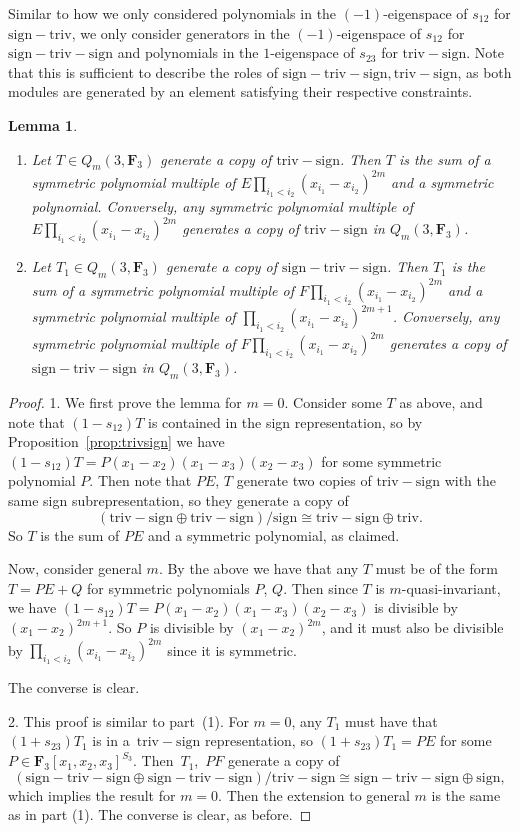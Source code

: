 \documentclass[pdftex]{sigma}
\newtheorem{Lemma}[Theorem]{Lemma}
\theoremstyle{definition}
\numberwithin{equation}{section}
\newcommand{\triv}{\mathrm{triv}}
\newcommand{\sign}{\mathrm{sign}}
\newcommand{\six}{\mathrm{sign-triv-sign}}
\newcommand{\siv}{\mathrm{sign-triv}}
\newcommand{\tign}{\mathrm{triv-sign}}
\begin{document}
 Similar to how we only considered polynomials in the $(-1)$-eigenspace of $s_{12}$ for $\siv$, we only consider generators in the $(-1)$-eigenspace of $s_{12}$ for $\six$ and polynomials in the $1$-eigenspace of $s_{23}$ for $\tign$. Note that this is sufficient to describe the roles of $\six,\tign$, as both modules are generated by an element satisfying their respective constraints.

 \begin{Lemma}\label{lem:sixgen}
 \quad
 \begin{enumerate}\itemsep=0pt
\item[$1.$] Let $T\in Q_m(3,\mathbf{F}_3)$ generate a copy of $\tign$. Then $T$ is the sum of a symmetric polynomial multiple of $E\prod_{i_1<i_2}(x_{i_1}-x_{i_2})^{2m}$ and a symmetric polynomial. Conversely, any symmetric polynomial multiple of $E\prod_{i_1<i_2}(x_{i_1}-x_{i_2})^{2m}$ generates a copy of $\tign$ in $Q_m(3,\mathbf{F}_3)$.
\item[$2.$] Let $T_1\in Q_m(3,\mathbf{F}_3)$ generate a copy of $\six$. Then $T_1$ is the sum of a symmetric polynomial multiple of $F\prod_{i_1<i_2}(x_{i_1}-x_{i_2})^{2m}$ and a symmetric polynomial multiple of $\prod_{i_1<i_2}(x_{i_1}-x_{i_2})^{2m+1}$. Conversely, any symmetric polynomial multiple of $F\prod_{i_1<i_2}(x_{i_1}-x_{i_2})^{2m}$ generates a copy of $\six$ in $Q_m(3,\mathbf{F}_3)$.
 \end{enumerate}
 \end{Lemma}

 \begin{proof}
 1. We first prove the lemma for $m=0$. Consider some $T$ as above, and note that $(1-s_{12})T$ is contained in the sign representation, so by Proposition~\ref{prop:trivsign} we have $(1-s_{12})T=P(x_1-x_2)(x_1-x_3)(x_2-x_3)$ for some symmetric polynomial $P$. Then note that $PE$, $T$ generate two copies of $\tign$ with the same sign subrepresentation, so they generate a copy of
 \[(\tign\oplus\tign)/\sign\cong\tign\oplus\triv.\]
 So $T$ is the sum of $PE$ and a symmetric polynomial, as claimed.

 Now, consider general $m$. By the above we have that any $T$ must be of the form $T=PE+Q$ for symmetric polynomials $P$, $Q$. Then since $T$ is $m$-quasi-invariant, we have $(1-s_{12})T=P(x_1-x_2)(x_1-x_3)(x_2-x_3)$ is divisible by $(x_1-x_2)^{2m+1}$. So $P$ is divisible by $(x_1-x_2)^{2m}$, and it must also be divisible by $\prod_{i_1<i_2}(x_{i_1}-x_{i_2})^{2m}$ since it is symmetric.

 The converse is clear.

 2. This proof is similar to part~(1). For $m=0$, any $T_1$ must have that $(1+s_{23})T_1$ is in a~$\tign$ representation, so $(1+s_{23})T_1=PE$ for some $P\in\mathbf{F}_3[x_1,x_2,x_3]^{S_3}$. Then~$T_1$,~$PF$ generate a copy of
 \[(\six\oplus\six)/\tign\cong\six\oplus\sign,\]
 which implies the result for $m=0$. Then the extension to general $m$ is the same as in part (1). The converse is clear, as before.
 \end{proof}
\end{document}
